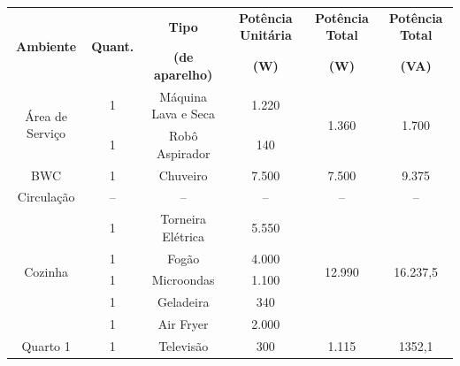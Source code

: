 \documentclass[12pt,openright,oneside,a4paper,brazil]{abntex2}
\begin{document}
\begin{table}[H]
\begin{sideways}
\begin{minipage}{\textheight}
        \begin{tabular}{cccccc}
        \toprule
        \multirow{2}{*}{\textbf{Ambiente}} & \multirow{2}{*}{\textbf{Quant.}} & \textbf{Tipo}          & \textbf{Potência Unitária} & \textbf{Potência Total} & \textbf{Potência Total}   \\
        &                                  & \textbf{(de aparelho)} & \textbf{(W)}               & \textbf{(W)}            & \textbf{(VA)}             \\
        \midrule
        \multirow{2}{*}{Área de Serviço}   & 1                                & Máquina Lava e Seca    & 1.220                      & \multirow{2}{*}{1.360}  & \multirow{2}{*}{1.700}    \\
        & 1                                & Robô Aspirador         & 140                        &                         &                           \\
        \midrule
        BWC                                & 1                                & Chuveiro               & 7.500                      & 7.500                   & 9.375                     \\
        \midrule
        Circulação                         & --                                & --                      & --                          & --                       & --                         \\
        \midrule
        \multirow{5}{*}{Cozinha}           & 1                                & Torneira Elétrica      & 5.550                      & \multirow{5}{*}{12.990} & \multirow{5}{*}{16.237,5} \\
        & 1                                & Fogão                  & 4.000                      &                         &                           \\
        & 1                                & Microondas             & 1.100                      &                         &                           \\
        & 1                                & Geladeira              & 340                        &                         &                           \\
        & 1                                & Air Fryer              & 2.000                      &                         &                           \\
        \midrule
        \multirow{2}{*}{Quarto 1}          & 1                                & Televisão              & 300                        & \multirow{2}{*}{1.115}  & \multirow{2}{*}{1352,1}  \\

\end{tabular}
\end{minipage}
\end{sideways}
\end{table}
\end{document}
